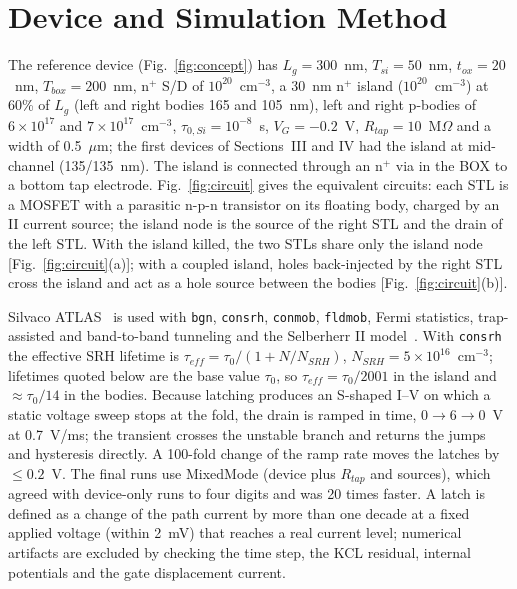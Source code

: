 \documentclass[journal]{IEEEtran}
\begin{document}
\section{Device and Simulation Method}
The reference device (Fig.~\ref{fig:concept}) has $L_g=300$~nm, $T_{si}=50$~nm, $t_{ox}=20$~nm, $T_{box}=200$~nm, n$^+$ S/D of $10^{20}$~cm$^{-3}$, a 30~nm n$^+$ island ($10^{20}$~cm$^{-3}$) at 60\% of $L_g$ (left and right bodies 165 and 105~nm), left and right p-bodies of $6\times10^{17}$ and $7\times10^{17}$~cm$^{-3}$, $\tau_{0,Si}=10^{-8}$~s, $V_G=-0.2$~V, $R_{tap}=10$~M$\Omega$ and a width of 0.5~$\mu$m; the first devices of Sections~III and IV had the island at mid-channel (135/135~nm). The island is connected through an n$^+$ via in the BOX to a bottom tap electrode. Fig.~\ref{fig:circuit} gives the equivalent circuits: each STL is a MOSFET with a parasitic n-p-n transistor on its floating body, charged by an II current source; the island node is the source of the right STL and the drain of the left STL. With the island killed, the two STLs share only the island node [Fig.~\ref{fig:circuit}(a)]; with a coupled island, holes back-injected by the right STL cross the island and act as a hole source between the bodies [Fig.~\ref{fig:circuit}(b)].

Silvaco ATLAS~\cite{atlas} is used with \texttt{bgn}, \texttt{consrh}, \texttt{conmob}, \texttt{fldmob}, Fermi statistics, trap-assisted and band-to-band tunneling and the Selberherr II model~\cite{selberherr,maes}. With \texttt{consrh} the effective SRH lifetime is $\tau_{eff}=\tau_0/(1+N/N_{SRH})$, $N_{SRH}=5\times10^{16}$~cm$^{-3}$; lifetimes quoted below are the base value $\tau_0$, so $\tau_{eff}=\tau_0/2001$ in the island and $\approx\tau_0/14$ in the bodies. Because latching produces an S-shaped I--V on which a static voltage sweep stops at the fold, the drain is ramped in time, 0$\rightarrow$6$\rightarrow$0~V at 0.7~V/ms; the transient crosses the unstable branch and returns the jumps and hysteresis directly. A 100-fold change of the ramp rate moves the latches by $\le0.2$~V. The final runs use MixedMode (device plus $R_{tap}$ and sources), which agreed with device-only runs to four digits and was 20 times faster. A latch is defined as a change of the path current by more than one decade at a fixed applied voltage (within 2~mV) that reaches a real current level; numerical artifacts are excluded by checking the time step, the KCL residual, internal potentials and the gate displacement current.
\end{document}
